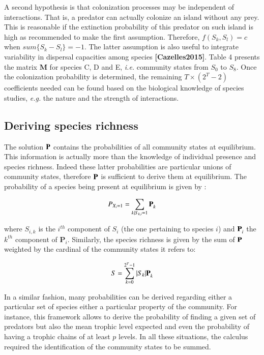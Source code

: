 A second hypothesis is that colonization processes may be independent of
interactions. That is, a predator can actually colonize an island
without any prey. This is reasonable if the extinction probability of
this predator on such island is high as recommended to make the first
assumption. Therefore, \(f(S_k,S_l)=c\) when \(sum\{S_k-S_l\}=-1\). The
latter assumption is also useful to integrate variability in dispersal
capacities among species \textbf{{[}Cazelles2015{]}}. Table 4 presents
the matrix \(\mathbf{M}\) for species C, D and E, \emph{i.e.} community
states from \(S_0\) to \(S_8\). Once the colonization probability is
determined, the remaining \(T \times (2^T-2)\) coefficients needed can
be found based on the biological knowledge of species studies,
\emph{e.g.} the nature and the strength of interactions.

\subsection{Deriving species richness}\label{deriving-species-richness}

The solution \(\mathbf{P}^{\*}\) contains the probabilities of all
community states at equilibrium. This information is actually more than
the knowledge of individual presence and species richness. Indeed these
latter probabilities are particular unions of community states,
therefore \(\mathbf{P}^{\*}\) is sufficient to derive them at
equilibrium. The probability of a species being present at equilibrium
is given by :

\begin{equation}
P_{X_i=1} = \sum_{k \mid S_{k,i}=1} \mathbf{P}_{k}^{\*}
\end{equation}

where \(S_{i,k}\) is the \(i^{th}\) component of \(S_i\) (the one
pertaining to species \(i\)) and \(\mathbf{P}_{i}^{\*}\) the \(k^{th}\)
component of \(\mathbf{P}_{i}\). Similarly, the species richness is
given by the sum of \(\mathbf{P}^{\*}\) weighted by the cardinal of the
community states it refers to:

\begin{equation}
S= \sum_{k=0}^{2^T-1} |S_k|\mathbf{P}_{k}^{\*}
\end{equation}

In a similar fashion, many probabilities can be derived regarding either
a particular set of species either a particular property of the
community. For instance, this framework allows to derive the probability
of finding a given set of predators but also the mean trophic level
expected and even the probability of having a trophic chains of at least
\(p\) levels. In all these situations, the calculus required the
identification of the community states to be summed.

